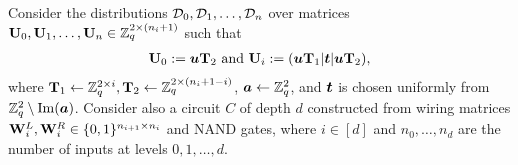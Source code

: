 
Consider the distributions $\mathcal{D}_0,\mathcal{D}_1,\ldots,\mathcal{D}_n$ over matrices $\mathbf{{U}}_0,\mathbf{{U}}_1,\ldots,\mathbf{{U}}_n\in\mathbb{Z}_q^{2\times(n_i+1)}$ such that 
\begin{align}
\mathbf{{U}}_0 := {\boldsymbol{u}}\mathbf{{T}}_2 \text{ and } \mathbf{{U}}_i := ({\boldsymbol{u}}\mathbf{{T}}_1|{\boldsymbol{t}}|{\boldsymbol{u}}\mathbf{{T}}_2),
\end{align}
where $\mathbf{{T}}_1 \gets\mathbb{Z}_q^{2\times i},\mathbf{{T}}_2\gets\mathbb{Z}_q^{2\times(n_i+1-i)}$, ${\boldsymbol{a}}\gets\mathbb{Z}_q^2$, and ${\boldsymbol{t}}$ is chosen uniformly from $\mathbb{Z}_q^{2}\setminus\mathrm{Im}({\boldsymbol{a}})$.
Consider also a circuit $C$ of depth $d$ constructed from wiring matrices $\mathbf{{W}}^L_i,\mathbf{{W}}^R_i\in\{0,1\}^{n_{i+1}\times n_i}$ and NAND gates, where $i\in[d]$ and $n_0,\ldots,n_d$ are the number of inputs at levels $0,1,\ldots,d$.

